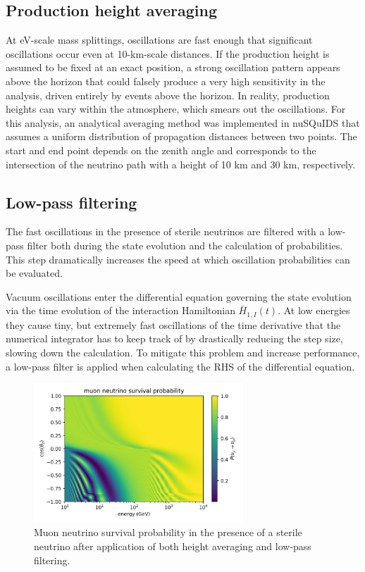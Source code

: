 \subsection{Production height averaging}
At eV-scale mass splittings, oscillations are fast enough that significant oscillations occur even at 10-km-scale distances. If the production height is assumed to be fixed at an exact position, a strong oscillation pattern appears above the horizon that could falsely produce a very high sensitivity in the analysis, driven entirely by events above the horizon. In reality, production heights can vary within the atmosphere, which smears out the oscillations. For this analysis, an analytical averaging method was implemented in nuSQuIDS that assumes a uniform distribution of propagation distances between two points. The start and end point depends on the zenith angle and corresponds to the intersection of the neutrino path with a height of 10 km and 30 km, respectively.

\subsection{Low-pass filtering}
\label{sec:low-pass-filtering}
The fast oscillations in the presence of sterile neutrinos are filtered with a low-pass filter both during the state evolution and the calculation of probabilities. This step dramatically increases the speed at which oscillation probabilities can be evaluated.

Vacuum oscillations enter the differential equation governing the state evolution via the time evolution of the interaction Hamiltonian $\bar{H}_{1, I}(t)$. At low energies they cause tiny, but extremely fast oscillations of the time derivative that the numerical integrator has to keep track of by drastically reducing the step size, slowing down the calculation. To mitigate this problem and increase performance, a low-pass filter is applied when calculating the RHS of the differential equation.

\begin{figure}
    \centering
    \includegraphics[width=0.7\textwidth]{figures/measurement/sterile_analysis/nusquids/Dm41_0.5eV2_th24_15deg_avg_height_10-30km_lp_belowhor.png}
    \caption{Muon neutrino survival probability in the presence of a sterile neutrino after application of both height averaging and low-pass filtering.}
    \label{fig:nusquids-low-pass-filtering}
\end{figure}

